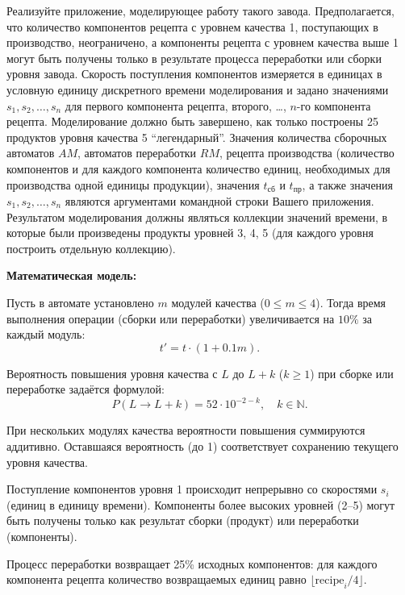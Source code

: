 \documentclass[a4paper]{article}
\theoremstyle{definition}
\begin{document}
Реализуйте приложение, моделирующее работу такого завода. Предполагается, что количество компонентов рецепта с уровнем качества 1, поступающих в производство, неограничено, а компоненты рецепта с уровнем качества выше 1 могут быть получены только в результате процесса переработки или сборки уровня завода. Скорость поступления компонентов измеряется в единицах в условную единицу дискретного времени моделирования и задано значениями $s_1, s_2, \dots, s_n$ для первого компонента рецепта, второго, \dots, $n$-го компонента рецепта. Моделирование должно быть завершено, как только построены 25 продуктов уровня качества 5 ``легендарный''. Значения количества сборочных автоматов $AM$, автоматов переработки $RM$, рецепта производства (количество компонентов и для каждого компонента количество единиц, необходимых для производства одной единицы продукции), значения $t_{\text{сб}}$ и $t_{\text{пр}}$, а также значения $s_1, s_2, \dots, s_n$ являются аргументами командной строки Вашего приложения. Результатом моделирования должны являться коллекции значений времени, в которые были произведены продукты уровней 3, 4, 5 (для каждого уровня построить отдельную коллекцию).

\textbf{Математическая модель:}

Пусть в автомате установлено $m$ модулей качества ($0 \le m \le 4$). Тогда время выполнения операции (сборки или переработки) увеличивается на $10\%$ за каждый модуль:
\begin{equation}
    t' = t \cdot (1 + 0.1 m). \tag{3.1}
\end{equation}

Вероятность повышения уровня качества с $L$ до $L+k$ ($k \ge 1$) при сборке или переработке задаётся формулой:
\begin{equation}
    P(L \to L+k) = 52 \cdot 10^{-2-k}, \quad k \in \mathbb{N}. \tag{3.2}
\end{equation}

При нескольких модулях качества вероятности повышения суммируются аддитивно. Оставшаяся вероятность (до 1) соответствует сохранению текущего уровня качества.

Поступление компонентов уровня 1 происходит непрерывно со скоростями $s_i$ (единиц в единицу времени). Компоненты более высоких уровней (2–5) могут быть получены только как результат сборки (продукт) или переработки (компоненты).

Процесс переработки возвращает 25\% исходных компонентов: для каждого компонента рецепта количество возвращаемых единиц равно $\lfloor \text{recipe}_i / 4 \rfloor$.
\end{document}
